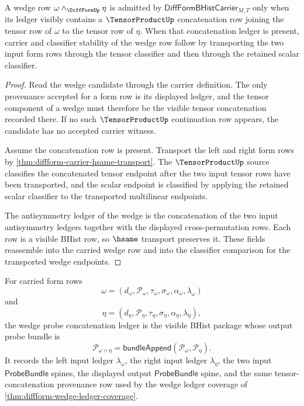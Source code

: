 \begin{theorem}
\label{thm:diffform-wedge-ledger-coverage}
A wedge row $\omega\wedge_{\DiffFormUp}\eta$ is admitted by
$\mathsf{DiffFormBHistCarrier}_{M,T}$ only when its ledger visibly contains a
$\TensorProductUp$ concatenation row joining the tensor row of $\omega$ to the
tensor row of $\eta$. When that concatenation ledger is present, carrier and
classifier stability of the wedge row follow by transporting the two input
form rows through the tensor classifier and then through the retained scalar
classifier.
\end{theorem}
\begin{proof}
Read the wedge candidate through the carrier definition. The only provenance
accepted for a form row is its displayed ledger, and the tensor component of a
wedge must therefore be the visible tensor concatenation recorded there. If no
such $\TensorProductUp$ continuation row appears, the candidate has no accepted
carrier witness.

Assume the concatenation row is present. Transport the left and right form
rows by \autoref{thm:diffform-carrier-hsame-transport}. The
$\TensorProductUp$ source classifies the concatenated tensor endpoint after
the two input tensor rows have been transported, and the scalar endpoint is
classified by applying the retained scalar classifier to the transported
multilinear endpoints.

The antisymmetry ledger of the wedge is the concatenation of the two input
antisymmetry ledgers together with the displayed cross-permutation rows. Each
row is a visible BHist row, so $\hsame$ transport preserves it. These fields
reassemble into the carried wedge row and into the classifier comparison for
the transported wedge endpoints.
\end{proof}

\begin{definition}
\label{def:diffform-wedge-probe-concatenation-ledger}
For carried form rows
$$
\omega=(d_\omega,\mathcal{P}_\omega,\tau_\omega,\sigma_\omega,\alpha_\omega,\lambda_\omega)
$$
and
$$
\eta=(d_\eta,\mathcal{P}_\eta,\tau_\eta,\sigma_\eta,\alpha_\eta,\lambda_\eta),
$$
the wedge probe concatenation ledger is the visible BHist package whose output
probe bundle is
$$
\mathcal{P}_{\omega\wedge\eta}
=\mathsf{bundleAppend}(\mathcal{P}_\omega,\mathcal{P}_\eta).
$$
It records the left input ledger $\lambda_\omega$, the right input ledger
$\lambda_\eta$, the two input $\mathsf{ProbeBundle}$ spines, the displayed
output $\mathsf{ProbeBundle}$ spine, and the same tensor-concatenation
provenance row used by the wedge ledger coverage of
\autoref{thm:diffform-wedge-ledger-coverage}.
\end{definition}

